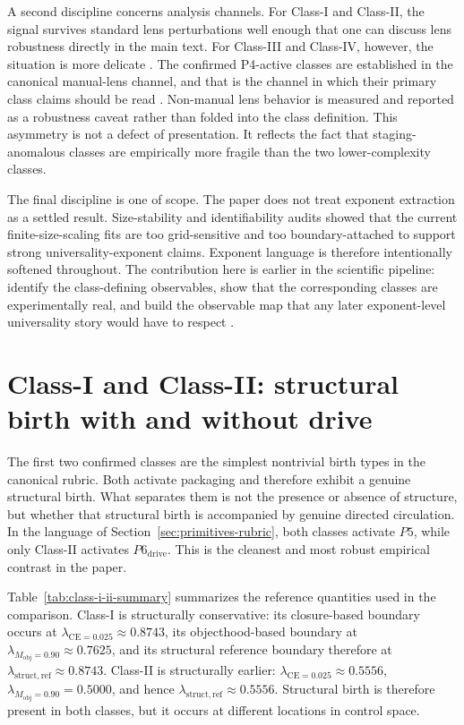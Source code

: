 \documentclass[11pt]{article}
\begin{document}
A second discipline concerns analysis channels. For Class-I and Class-II, the signal survives standard lens perturbations well enough that one can discuss lens robustness directly in the main text. For Class-III and Class-IV, however, the situation is more delicate \cite{mardt_noe_2021,nitskansky_clein_raveh_2026}. The confirmed P4-active classes are established in the canonical manual-lens channel, and that is the channel in which their primary class claims should be read \cite{sixbirds_lay_stone}. Non-manual lens behavior is measured and reported as a robustness caveat rather than folded into the class definition. This asymmetry is not a defect of presentation. It reflects the fact that staging-anomalous classes are empirically more fragile than the two lower-complexity classes.

The final discipline is one of scope. The paper does not treat exponent extraction as a settled result. Size-stability and identifiability audits showed that the current finite-size-scaling fits are too grid-sensitive and too boundary-attached to support strong universality-exponent claims. Exponent language is therefore intentionally softened throughout. The contribution here is earlier in the scientific pipeline: identify the class-defining observables, show that the corresponding classes are experimentally real, and build the observable map that any later exponent-level universality story would have to respect \cite{sixbirds_foundations,sixbirds_create_stone}.
 \section{Class-I and Class-II: structural birth with and without drive}
\label{sec:class-i-ii}

The first two confirmed classes are the simplest nontrivial birth types in the canonical rubric. Both activate packaging and therefore exhibit a genuine structural birth. What separates them is not the presence or absence of structure, but whether that structural birth is accompanied by genuine directed circulation. In the language of Section~\ref{sec:primitives-rubric}, both classes activate $P5$, while only Class-II activates $P6_{\mathrm{drive}}$. This is the cleanest and most robust empirical contrast in the paper.

Table~\ref{tab:class-i-ii-summary} summarizes the reference quantities used in the comparison. Class-I is structurally conservative: its closure-based boundary occurs at $\lambda_{\mathrm{CE}=0.025}\approx 0.8743$, its objecthood-based boundary at $\lambda_{M_{\mathrm{obj}}=0.90}\approx 0.7625$, and its structural reference boundary therefore at $\lambda_{\mathrm{struct,ref}}\approx 0.8743$. Class-II is structurally earlier: $\lambda_{\mathrm{CE}=0.025}\approx 0.5556$, $\lambda_{M_{\mathrm{obj}}=0.90}=0.5000$, and hence $\lambda_{\mathrm{struct,ref}}\approx 0.5556$. Structural birth is therefore present in both classes, but it occurs at different locations in control space.
\end{document}
